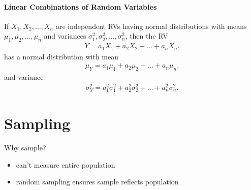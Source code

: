 \documentclass[10pt]{article}
\begin{document}
\subsection{Linear Combinations of Random Variables}
\begin{theorem}
    If $X_1, X_2, \ldots, X_n$ are independent RVs having normal distributions with means $\mu_1, \mu_2, \ldots, \mu_n$ and variances $\sigma_1^2, \sigma_2^2, \ldots, \sigma_n^2$, then the RV
    \begin{gather*}
        Y = a_1X_1 + a_2X_2 + \ldots + a_nX_n
    .\end{gather*}
    has a normal distribution with mean
    \begin{gather*}
        \mu_Y = a_1\mu_1 + a_2\mu_2 + \ldots + a_n\mu_n
    .\end{gather*}
    and variance 
    \begin{gather*}
        \sigma_Y^2 = a_1^2 \sigma_1^2 + a_2^2 \sigma_2^2 + \ldots + a_n^2 \sigma_n^2
    .\end{gather*}
\end{theorem}









\newpage

\part{Sampling}
Why sample?
\begin{itemize}
    \item can't measure entire population
    \item random sampling ensures sample reflects population
\end{itemize}
\end{document}
